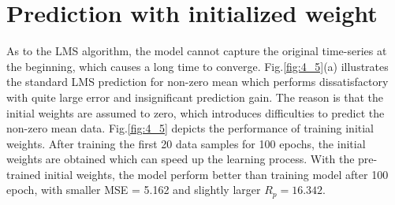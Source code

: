 \section{Prediction with initialized weight}
As to the LMS algorithm, the model cannot capture the original time-series at the beginning, which causes a long time to converge. Fig.\ref{fig:4_5}(a) illustrates the standard LMS prediction for non-zero mean which performs dissatisfactory with quite large error and insignificant prediction gain. The reason is that the initial weights are assumed to zero, which introduces difficulties to predict the non-zero mean data. Fig.\ref{fig:4_5} depicts the performance of training initial weights. After training the first 20 data samples for 100 epochs, the initial weights are obtained which can speed up the learning process. With the pre-trained initial weights, the model perform better than training model after 100 epoch, with smaller MSE = 5.162 and slightly larger $R_p=16.342$. 
